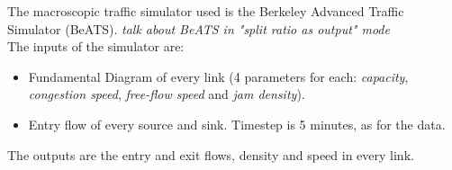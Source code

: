 The macroscopic traffic simulator used is the Berkeley Advanced Traffic Simulator (BeATS). \emph{talk about BeATS in "split ratio as output" mode}\\
The inputs of the simulator are:
\begin{itemize}
	\item Fundamental Diagram of every link (4 parameters for each: \emph{capacity}, \emph{congestion speed}, \emph{free-flow speed} and \emph{jam density}).
	\item Entry flow of every source and sink. Timestep is 5 minutes, as for the data.
\end{itemize}
The outputs are the entry and exit flows, density and speed in every link.
